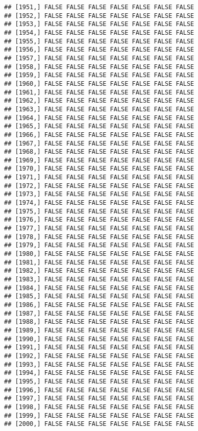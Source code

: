 \documentclass[
]{article}
\begin{document}
\begin{verbatim}
## [1951,] FALSE FALSE FALSE FALSE FALSE FALSE FALSE
## [1952,] FALSE FALSE FALSE FALSE FALSE FALSE FALSE
## [1953,] FALSE FALSE FALSE FALSE FALSE FALSE FALSE
## [1954,] FALSE FALSE FALSE FALSE FALSE FALSE FALSE
## [1955,] FALSE FALSE FALSE FALSE FALSE FALSE FALSE
## [1956,] FALSE FALSE FALSE FALSE FALSE FALSE FALSE
## [1957,] FALSE FALSE FALSE FALSE FALSE FALSE FALSE
## [1958,] FALSE FALSE FALSE FALSE FALSE FALSE FALSE
## [1959,] FALSE FALSE FALSE FALSE FALSE FALSE FALSE
## [1960,] FALSE FALSE FALSE FALSE FALSE FALSE FALSE
## [1961,] FALSE FALSE FALSE FALSE FALSE FALSE FALSE
## [1962,] FALSE FALSE FALSE FALSE FALSE FALSE FALSE
## [1963,] FALSE FALSE FALSE FALSE FALSE FALSE FALSE
## [1964,] FALSE FALSE FALSE FALSE FALSE FALSE FALSE
## [1965,] FALSE FALSE FALSE FALSE FALSE FALSE FALSE
## [1966,] FALSE FALSE FALSE FALSE FALSE FALSE FALSE
## [1967,] FALSE FALSE FALSE FALSE FALSE FALSE FALSE
## [1968,] FALSE FALSE FALSE FALSE FALSE FALSE FALSE
## [1969,] FALSE FALSE FALSE FALSE FALSE FALSE FALSE
## [1970,] FALSE FALSE FALSE FALSE FALSE FALSE FALSE
## [1971,] FALSE FALSE FALSE FALSE FALSE FALSE FALSE
## [1972,] FALSE FALSE FALSE FALSE FALSE FALSE FALSE
## [1973,] FALSE FALSE FALSE FALSE FALSE FALSE FALSE
## [1974,] FALSE FALSE FALSE FALSE FALSE FALSE FALSE
## [1975,] FALSE FALSE FALSE FALSE FALSE FALSE FALSE
## [1976,] FALSE FALSE FALSE FALSE FALSE FALSE FALSE
## [1977,] FALSE FALSE FALSE FALSE FALSE FALSE FALSE
## [1978,] FALSE FALSE FALSE FALSE FALSE FALSE FALSE
## [1979,] FALSE FALSE FALSE FALSE FALSE FALSE FALSE
## [1980,] FALSE FALSE FALSE FALSE FALSE FALSE FALSE
## [1981,] FALSE FALSE FALSE FALSE FALSE FALSE FALSE
## [1982,] FALSE FALSE FALSE FALSE FALSE FALSE FALSE
## [1983,] FALSE FALSE FALSE FALSE FALSE FALSE FALSE
## [1984,] FALSE FALSE FALSE FALSE FALSE FALSE FALSE
## [1985,] FALSE FALSE FALSE FALSE FALSE FALSE FALSE
## [1986,] FALSE FALSE FALSE FALSE FALSE FALSE FALSE
## [1987,] FALSE FALSE FALSE FALSE FALSE FALSE FALSE
## [1988,] FALSE FALSE FALSE FALSE FALSE FALSE FALSE
## [1989,] FALSE FALSE FALSE FALSE FALSE FALSE FALSE
## [1990,] FALSE FALSE FALSE FALSE FALSE FALSE FALSE
## [1991,] FALSE FALSE FALSE FALSE FALSE FALSE FALSE
## [1992,] FALSE FALSE FALSE FALSE FALSE FALSE FALSE
## [1993,] FALSE FALSE FALSE FALSE FALSE FALSE FALSE
## [1994,] FALSE FALSE FALSE FALSE FALSE FALSE FALSE
## [1995,] FALSE FALSE FALSE FALSE FALSE FALSE FALSE
## [1996,] FALSE FALSE FALSE FALSE FALSE FALSE FALSE
## [1997,] FALSE FALSE FALSE FALSE FALSE FALSE FALSE
## [1998,] FALSE FALSE FALSE FALSE FALSE FALSE FALSE
## [1999,] FALSE FALSE FALSE FALSE FALSE FALSE FALSE
## [2000,] FALSE FALSE FALSE FALSE FALSE FALSE FALSE

\end{verbatim}
\end{document}
